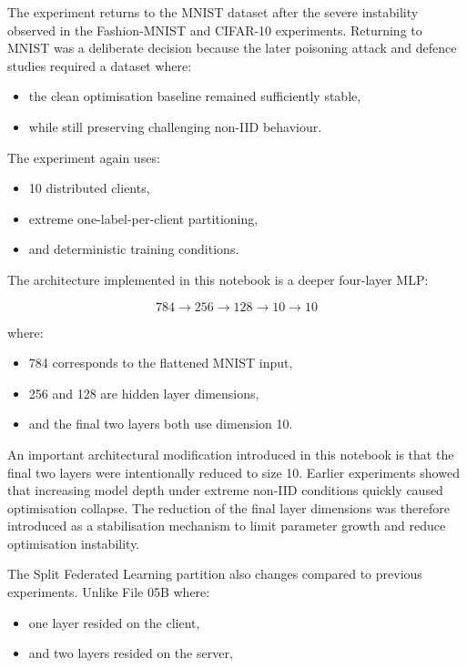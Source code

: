The experiment returns to the MNIST dataset after the severe instability observed in the Fashion-MNIST and CIFAR-10 experiments. Returning to MNIST was a deliberate decision because the later poisoning attack and defence studies required a dataset where:
\begin{itemize}
    \item the clean optimisation baseline remained sufficiently stable,
    \item while still preserving challenging non-IID behaviour.
\end{itemize}

The experiment again uses:
\begin{itemize}
    \item 10 distributed clients,
    \item extreme one-label-per-client partitioning,
    \item and deterministic training conditions.
\end{itemize}

The architecture implemented in this notebook is a deeper four-layer MLP:

\[
784 \rightarrow 256 \rightarrow 128 \rightarrow 10 \rightarrow 10
\]

where:
\begin{itemize}
    \item 784 corresponds to the flattened MNIST input,
    \item 256 and 128 are hidden layer dimensions,
    \item and the final two layers both use dimension 10.
\end{itemize}

An important architectural modification introduced in this notebook is that the final two layers were intentionally reduced to size 10. Earlier experiments showed that increasing model depth under extreme non-IID conditions quickly caused optimisation collapse. The reduction of the final layer dimensions was therefore introduced as a stabilisation mechanism to limit parameter growth and reduce optimisation instability.

The Split Federated Learning partition also changes compared to previous experiments. Unlike File 05B where:
\begin{itemize}
    \item one layer resided on the client,
    \item and two layers resided on the server,
\end{itemize}

